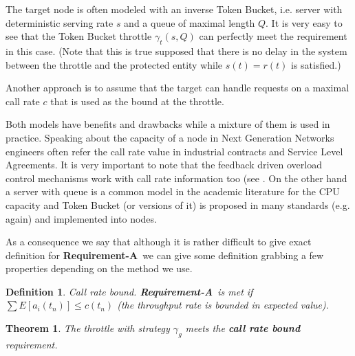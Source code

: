 \documentclass[conference]{IEEEtran}
\newtheorem{theorem}{Theorem}
\newtheorem{definition}{Definition}
\newcommand{\reqA}{\textbf{Requirement-A}}
\begin{document}
The target node is often modeled with an inverse Token Bucket, i.e.
server with deterministic serving rate $s$ and a queue of maximal
length $Q$. It is very easy to see that the Token Bucket throttle
$\gamma_t(s,Q)$ can perfectly meet the requirement in this case.
(Note that this is true supposed that there is no delay in the
system between the throttle and the protected entity while
$s(t)=r(t)$ is satisfied.)

Another approach is to assume that the target can handle requests on
a maximal call rate $c$ that is used as the bound at the throttle.

Both models have benefits and drawbacks while a mixture of them is
used in practice. Speaking about the capacity of a node in Next
Generation Networks engineers often refer the call rate value in
industrial contracts and Service Level Agreements. It is very
important to note that the feedback driven overload control
mechanisms work with call rate information too (see \cite{H.248.11}.
On the other hand a server with queue is a common model in the
academic literature for the CPU capacity and Token Bucket (or
versions of it) is proposed in many standards (e.g. \cite{H.248.11}
again) and implemented into nodes.

As a consequence we say that although it is rather difficult to give
exact definition for \reqA\ we can give some definition grabbing a
few properties depending on the method we use.

\begin{definition} Call rate bound. \reqA\ is met if $\sum
E[a_i(t_n)]\leq c(t_n)$ (the throughput rate is bounded in expected
value).
\end{definition}

\begin{theorem}\label{thm-gammaG-maxbound}
The throttle with strategy $\gamma_g$ meets the \textbf{call rate
bound} requirement.
\end{theorem}
\end{document}

